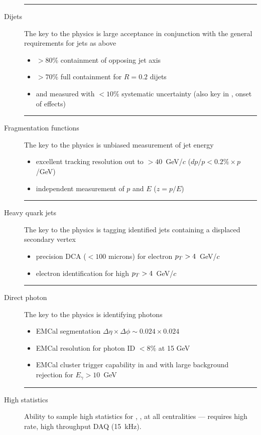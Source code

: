 \begin{description}
\hrule

\item[Dijets] The key to the physics is large acceptance in
  conjunction with the general requirements for jets as above
  \begin{itemize}
  \item $>80$\% containment of opposing jet axis
  \item $>70$\% full containment for $R=0.2$ dijets
  \item \RAA and \aj measured with $<10$\% systematic uncertainty (also
    key in \pA, onset of effects)
  \end{itemize}

\hrule

\item[Fragmentation functions] The key to the physics is unbiased
  measurement of jet energy
  \begin{itemize}
  \item excellent tracking resolution out to $>40$~GeV/$c$ ($dp/p <
    0.2\% \times p$/GeV)
  \item independent measurement of $p$ and $E$ ($z=p/E$)
  \end{itemize}

\hrule

\item[Heavy quark jets] The key to the physics is tagging identified
  jets containing a displaced secondary vertex
  \begin{itemize}
  \item precision DCA ($< 100$ microns) for electron $\mbox{${p_T}$} > 4$~GeV/$c$
  \item electron identification for high $\mbox{${p_T}$} > 4$~GeV/$c$
  \end{itemize}

\hrule

\item[Direct photon] The key to the physics is identifying photons
  \begin{itemize}
  \item EMCal segmentation $\Delta\eta \times\Delta\phi \sim 0.024 \times 0.024$
  \item EMCal resolution for photon ID $<8\%$ at 15 GeV
  \item EMCal cluster trigger capability in \pp and \pA with
    large background rejection for $E_\gamma > 10$~GeV
  \end{itemize}

\hrule

\item[High statistics] Ability to sample high statistics for \pp, \pA,
  \hic at all centralities --- requires high rate, high throughput DAQ
  (15~kHz).

\end{description}


